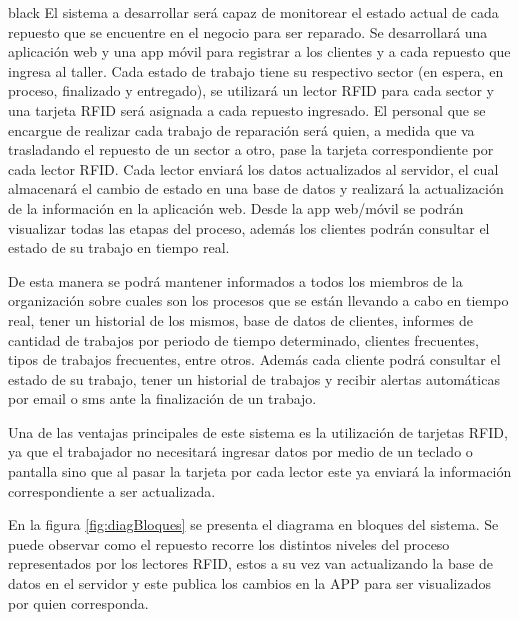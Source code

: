 \documentclass[11pt]{charter}
\begin{document}
\begin{consigna}{black}
El sistema a desarrollar será capaz de monitorear el estado actual de cada repuesto que se encuentre en el negocio para ser reparado.
Se desarrollará una aplicación web y una app móvil para registrar a los clientes y a cada repuesto que ingresa al taller.
Cada estado de trabajo tiene su respectivo sector (en espera, en proceso, finalizado y entregado), se utilizará un lector RFID para cada sector y una tarjeta RFID será asignada a cada repuesto ingresado.
El personal que se encargue de realizar cada trabajo de reparación será quien, a medida que va trasladando el repuesto de un sector a otro, pase la tarjeta correspondiente por cada lector RFID. 
Cada lector enviará los datos actualizados al servidor, el cual almacenará el cambio de estado en una base de datos y realizará la actualización de la información en la aplicación web.
Desde la app web/móvil se podrán visualizar todas las etapas del proceso, además los clientes podrán consultar el estado de su trabajo en tiempo real.

De esta manera se podrá mantener informados a todos los miembros de la organización sobre cuales son los procesos que se están llevando a cabo en tiempo real, tener un historial de los mismos, base de datos de clientes, informes de cantidad de trabajos por periodo de tiempo determinado, clientes frecuentes, tipos de trabajos frecuentes, entre otros.
Además cada cliente podrá consultar el estado de su trabajo, tener un historial de trabajos y recibir alertas automáticas por email o sms ante la finalización de un trabajo.

Una de las ventajas principales de este sistema es la utilización de tarjetas RFID, ya que el trabajador no necesitará ingresar datos por medio de un teclado o pantalla sino que al pasar la tarjeta por cada lector este ya enviará la información correspondiente a ser actualizada.

En la figura \ref{fig:diagBloques} se presenta el diagrama en bloques del sistema. Se puede observar como el repuesto recorre los distintos niveles del proceso representados por los lectores RFID, estos a su vez van actualizando la base de datos en el servidor y este publica los cambios en la APP para ser visualizados por quien corresponda.

\vspace{25px}


\end{consigna}
\end{document}
